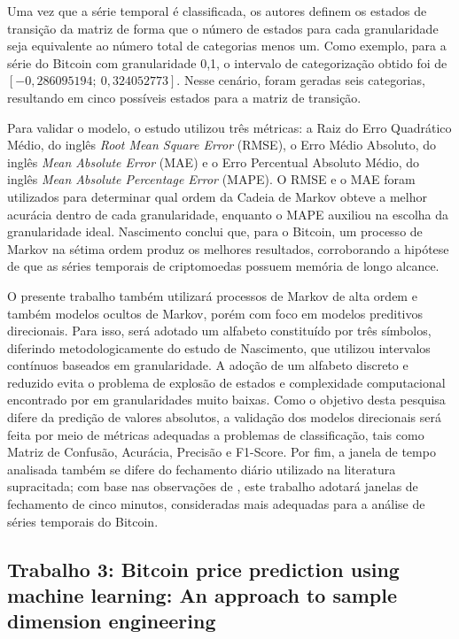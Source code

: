 \documentclass[
    12pt,                %
    openright,           %
    oneside,             %
    a4paper,             %
    english,             %
    brazil               %
]{abntex2}
\begin{document}
Uma vez que a série temporal é classificada, os autores definem os estados de transição da matriz de forma que o número de estados para cada granularidade seja equivalente ao número total de categorias menos um. Como exemplo, para a série do Bitcoin com granularidade 0,1, o intervalo de categorização obtido foi de $[-0{,}286095194;\ 0{,}324052773]$. Nesse cenário, foram geradas seis categorias, resultando em cinco possíveis estados para a matriz de transição.

Para validar o modelo, o estudo utilizou três métricas: a Raiz do Erro Quadrático Médio, do inglês \textit{Root Mean Square Error} (RMSE), o Erro Médio Absoluto, do inglês \textit{Mean Absolute Error} (MAE) e o Erro Percentual Absoluto Médio, do inglês \textit{Mean Absolute Percentage Error} (MAPE). O RMSE e o MAE foram utilizados para determinar qual ordem da Cadeia de Markov obteve a melhor acurácia dentro de cada granularidade, enquanto o MAPE auxiliou na escolha da granularidade ideal. Nascimento conclui que, para o Bitcoin, um processo de Markov na sétima ordem produz os melhores resultados, corroborando a hipótese de que as séries temporais de criptomoedas possuem memória de longo alcance.

O presente trabalho também utilizará processos de Markov de alta ordem e também modelos ocultos de Markov, porém com foco em modelos preditivos direcionais. Para isso, será adotado um alfabeto constituído por três símbolos, diferindo metodologicamente do estudo de Nascimento, que utilizou intervalos contínuos baseados em granularidade. A adoção de um alfabeto discreto e reduzido evita o problema de explosão de estados e complexidade computacional encontrado por  em granularidades muito baixas. Como o objetivo desta pesquisa difere da predição de valores absolutos, a validação dos modelos direcionais será feita por meio de métricas adequadas a problemas de classificação, tais como Matriz de Confusão, Acurácia, Precisão e F1-Score. Por fim, a janela de tempo analisada também se difere do fechamento diário utilizado na literatura supracitada; com base nas observações de , este trabalho adotará janelas de fechamento de cinco minutos, consideradas mais adequadas para a análise de séries temporais do Bitcoin.

\subsection{Trabalho 3: Bitcoin price prediction using machine learning: An approach
to sample dimension engineering}
\end{document}
